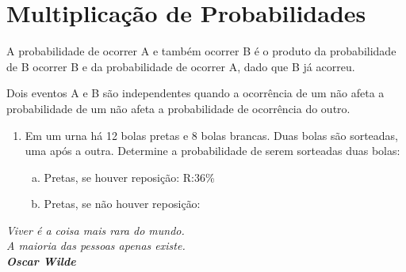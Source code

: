 \documentclass[twocolumn,oneside,a4paper,12pt]{article}
\begin{document}
\section*{Multiplicação de Probabilidades}


A probabilidade de ocorrer A e também ocorrer B é o produto da probabilidade de B ocorrer B e da probabilidade de ocorrer A, dado que B já acorreu.

Dois eventos A e B são independentes quando a ocorrência de um não afeta a probabilidade de um não afeta a probabilidade de ocorrência do outro.

\begin{enumerate}
\item Em um urna há 12 bolas pretas e 8 bolas brancas. Duas bolas são sorteadas, uma após a outra. Determine a probabilidade de serem sorteadas duas bolas:
\begin{enumerate}[(a)]
\item Pretas, se houver reposição: R:36\%
\item Pretas, se não houver reposição:
\end{enumerate}

\end{enumerate}

\begin{flushright}
\textit{Viver é a coisa mais rara do mundo.\\A maioria das pessoas apenas existe.\\\textbf{Oscar Wilde}}
\end{flushright}
\end{document}
